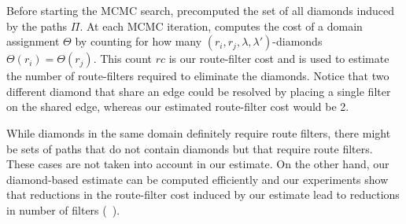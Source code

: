 Before  starting the MCMC search, \name precomputed
the set of all diamonds induced by the paths $\Pi$. 
At each MCMC iteration, \name computes the cost of a
domain assignment $\Theta$ by counting for how many $(r_i, r_j, \lambda, \lambda')$-diamonds
$\Theta(r_i) = \Theta(r_j)$. This count $rc$ is our route-filter cost and is used to estimate the number of route-filters
required to eliminate the diamonds.
Notice that two different diamond that share an edge could be resolved
by placing a single filter on the shared edge, whereas our estimated route-filter cost 
would be 2. 

While diamonds in the same domain definitely require route filters, there might be
sets of paths that do not contain diamonds but that require route filters. 
These cases are not
taken into account in our estimate. 
On the other hand, our diamond-based estimate
can be computed efficiently and 
our experiments show that reductions in the route-filter cost induced by our estimate
lead to reductions in number of filters (~). 


